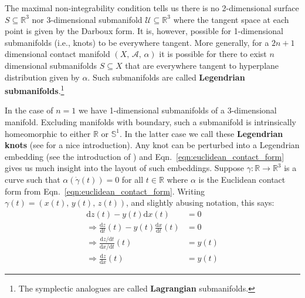     \par\hfill\par
    The maximal non-integrability condition tells us there is no 2-dimensional
    surface $S\subseteq\mathbb{R}^{3}$ nor 3-dimensional submanifold
    $\mathcal{U}\subseteq\mathbb{R}^{3}$ where the tangent space at each point
    is given by the Darboux form. It is, however, possible for 1-dimensional
    submanifolds (i.e., knots) to be everywhere tangent. More generally, for
    a $2n+1$ dimensional contact manifold $(X,\,\mathcal{A},\,\alpha)$ it is
    possible for there to exist $n$ dimensional submanifolds
    $S\subseteq{X}$ that are everywhere tangent to hyperplane distribution
    given by $\alpha$. Such submanifolds
    are called \textbf{Legendrian submanifolds}.\footnote{%
        The symplectic analogues are called \textbf{Lagrangian} submanifolds.
    }
    \par\hfill\par
    In the case of $n=1$ we have 1-dimensional submanifolds of a 3-dimensional
    manifold. Excluding manifolds with boundary, such a submanifold is
    intrinsically homeomorphic to either $\mathbb{R}$ or $\mathbb{S}^{1}$.
    In the latter case we call these \textbf{Legendrian knots}
    (see \cite{JoshuaMSabloffWhatIsLegendrianKnot} for a nice introduction).
    Any knot can be perturbed into a Legendrian embedding
    (see the introduction of \cite{VeraVertessiTransNonSimpleKnots}) and
    Eqn.~\ref{eqn:euclidean_contact_form} gives us much insight into the
    layout of such embeddings. Suppose
    $\gamma:\mathbb{R}\rightarrow\mathbb{R}^{3}$ is a curve such that
    $\alpha(\dot{\gamma}(t))=0$ for all $t\in\mathbb{R}$ where $\alpha$
    is the Euclidean contact form from Eqn.~\ref{eqn:euclidean_contact_form}.
    Writing $\gamma(t)=(x(t),\,y(t),\,z(t))$, and slightly abusing notation,
    this says:
    \begin{subequations}
        \label{eqn:euclidean_legendrian_knot_relations}
        \begin{align}
            \textrm{d}z(t)-y(t)\textrm{d}x(t)
            &=0\\
            \Rightarrow
            \frac{\textrm{d}z}{\textrm{d}t}(t)-
            y(t)\frac{\textrm{d}x}{\textrm{d}t}(t)
            &=0\\
            \Rightarrow
            \frac{\textrm{d}z/\textrm{d}t}{\textrm{d}x/\textrm{d}t}(t)
            &=y(t)\\
            \Rightarrow
            \frac{\textrm{d}z}{\textrm{d}x}(t)
            &=y(t)
        \end{align}
    \end{subequations}
